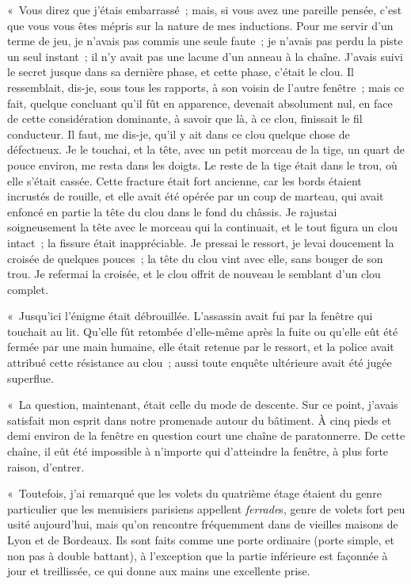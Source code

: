 \documentclass[french,twoside]{book} %
\begin{document}
« Vous direz que j’étais embarrassé ; mais, si vous avez une pareille pensée, c’est que vous vous êtes mépris sur la nature de mes inductions. Pour me servir d’un terme de jeu, je n’avais pas commis une seule faute ; je n’avais pas perdu la piste un seul instant ; il n’y avait pas une lacune d’un anneau à la chaîne. J’avais suivi le secret jusque dans sa dernière phase, et cette phase, c’était le clou. Il ressemblait, dis-je, sous tous les rapports, à son voisin de l’autre fenêtre ; mais ce fait, quelque concluant qu’il fût en apparence, devenait absolument nul, en face de cette considération dominante, à savoir que là, à ce clou, finissait le fil conducteur. Il faut, me dis-je, qu’il y ait dans ce clou quelque chose de défectueux. Je le touchai, et la tête, avec un petit morceau de la tige, un quart de pouce environ, me resta dans les doigts. Le reste de la tige était dans le trou, où elle s’était cassée. Cette fracture était fort ancienne, car les bords étaient incrustés de rouille, et elle avait été opérée par un coup de marteau, qui avait enfoncé en partie la tête du clou dans le fond du châssis. Je rajustai soigneusement la tête avec le morceau qui la continuait, et le tout figura un clou intact ; la fissure était inappréciable. Je pressai le ressort, je levai doucement la croisée de quelques pouces ; la tête du clou vint avec elle, sans bouger de son trou. Je refermai la croisée, et le clou offrit de nouveau le semblant d’un clou complet.\par
« Jusqu’ici l’énigme était débrouillée. L’assassin avait fui par la fenêtre qui touchait au lit. Qu’elle fût retombée d’elle-même après la fuite ou qu’elle eût été fermée par une main humaine, elle était retenue par le ressort, et la police avait attribué cette résistance au clou ; aussi toute enquête ultérieure avait été jugée superflue.\par
« La question, maintenant, était celle du mode de descente. Sur ce point, j’avais satisfait mon esprit dans notre promenade autour du bâtiment. À cinq pieds et demi environ de la fenêtre en question court une chaîne de paratonnerre. De cette chaîne, il eût été impossible à n’importe qui d’atteindre la fenêtre, à plus forte raison, d’entrer.\par
« Toutefois, j’ai remarqué que les volets du quatrième étage étaient du genre particulier que les menuisiers parisiens appellent \emph{ferrade}s, genre de volets fort peu usité aujourd’hui, mais qu’on rencontre fréquemment dans de vieilles maisons de Lyon et de Bordeaux. Ils sont faits comme une porte ordinaire (porte simple, et non pas à double battant), à l’exception que la partie inférieure est façonnée à jour et treillissée, ce qui donne aux mains une excellente prise.\par
\end{document}
